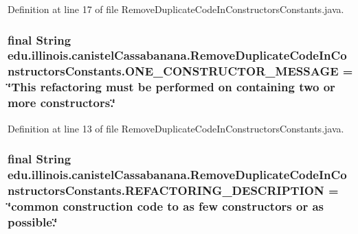 Definition at line 17 of file RemoveDuplicateCodeInConstructorsConstants.java.

\hypertarget{classedu_1_1illinois_1_1canistelCassabanana_1_1RemoveDuplicateCodeInConstructorsConstants_ad01fc3d835596cfcb50ebbf54a9c133e}{
\subsubsection[{ONE\_\-CONSTRUCTOR\_\-MESSAGE}]{\setlength{\rightskip}{0pt plus 5cm}final String {\bf edu.illinois.canistelCassabanana.RemoveDuplicateCodeInConstructorsConstants.ONE\_\-CONSTRUCTOR\_\-MESSAGE} = \char`\"{}This refactoring must be performed on containing two or more constructors.\char`\"{}}}
\label{classedu_1_1illinois_1_1canistelCassabanana_1_1RemoveDuplicateCodeInConstructorsConstants_ad01fc3d835596cfcb50ebbf54a9c133e}


Definition at line 13 of file RemoveDuplicateCodeInConstructorsConstants.java.

\hypertarget{classedu_1_1illinois_1_1canistelCassabanana_1_1RemoveDuplicateCodeInConstructorsConstants_abc82ec73939a90527fd8d564f097cef2}{
\subsubsection[{REFACTORING\_\-DESCRIPTION}]{\setlength{\rightskip}{0pt plus 5cm}final String {\bf edu.illinois.canistelCassabanana.RemoveDuplicateCodeInConstructorsConstants.REFACTORING\_\-DESCRIPTION} = \char`\"{}common construction code to as few constructors or as possible.\char`\"{}}}
\label{classedu_1_1illinois_1_1canistelCassabanana_1_1RemoveDuplicateCodeInConstructorsConstants_abc82ec73939a90527fd8d564f097cef2}


